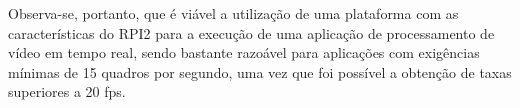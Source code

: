 \documentclass[conference]{IEEEtran}
\begin{document}
Observa-se, portanto, que é viável a utilização de uma plataforma com as características do RPI2 para a execução de uma aplicação de processamento de vídeo em tempo real, sendo bastante razoável para aplicações com exigências mínimas de 15 quadros por segundo, uma vez que foi possível a obtenção de taxas superiores a 20 fps. 












\end{document}
